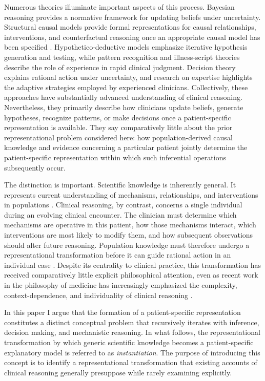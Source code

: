 \documentclass[11pt]{article}
\begin{document}
Numerous theories illuminate important aspects of this process.
Bayesian reasoning provides a normative framework for updating beliefs under uncertainty.
Structural causal models provide formal representations for causal relationships, interventions, and counterfactual reasoning once an appropriate causal model has been specified \parencite{pearl_causality_2013}. Hypothetico-deductive models emphasize iterative hypothesis generation and testing, while pattern recognition and illness-script theories describe the role of experience in rapid clinical judgment. Decision theory explains rational action under uncertainty, and research on expertise highlights the adaptive strategies employed by experienced clinicians. Collectively, these approaches have substantially advanced understanding of clinical reasoning. Nevertheless, they primarily describe how clinicians update beliefs, generate hypotheses, recognize patterns, or make decisions once a patient-specific representation is available. They say comparatively little about the prior representational problem considered here: how population-derived causal knowledge and evidence concerning a particular patient jointly determine the patient-specific representation within which such inferential operations subsequently occur.

The distinction is important. Scientific knowledge is inherently general. It represents current understanding of mechanisms, relationships, and interventions in populations
\parencite{collins_synthesis_2018}.
Clinical reasoning, by contrast, concerns a single individual during an evolving clinical encounter. The clinician must determine which mechanisms are operative in this patient, how those mechanisms interact, which interventions are most likely to modify them, and how subsequent observations should alter future reasoning. Population knowledge must therefore undergo a representational transformation before it can guide rational action in an individual case \parencite{collins_dynamic_2014}.
Despite its centrality to clinical practice, this transformation has received comparatively little explicit philosophical attention, even as recent work in the philosophy of medicine has increasingly emphasized the complexity, context-dependence, and individuality of clinical reasoning
\parencite{anjum2020rethinking}.

In this paper I argue that the formation of a patient-specific representation constitutes a distinct conceptual problem that recursively iterates with inference, decision making, and mechanistic reasoning. In what follows, the representational transformation by which generic scientific knowledge becomes a patient-specific explanatory model is referred to as \emph{instantiation}. The purpose of introducing this concept is to identify a representational transformation that existing accounts of clinical reasoning generally presuppose while rarely examining explicitly.
\end{document}
